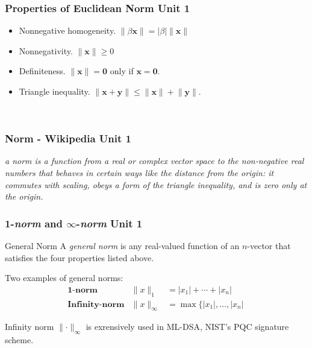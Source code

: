 \documentclass[12pt]{beamer}
\newcommand{\FrameTitle}[2]{\frametitle{#1 \hfill \small\textnormal{\textcolor{midgray}{#2}}}}
\newcommand{\snl}{\vspace*{4pt}\\}
\newcommand{\Quiz}[1]{{\large\textbf{\color{question}{#1}}}}
\newcommand{\QuizQuestion}[1]{{\Large\textbf{\color{question}{#1}}}}
\newcommand{\MVec}[1]{\mathbf{#1}}
\newcommand{\Norm}[1]{\lVert {\mathbf{#1}} \rVert}
\newcommand{\NormBeta}[1]{\lVert \beta \mathbf{#1} \rVert}
\newcommand{\abs}[1]{\lvert {#1} \rvert}
\begin{document}
\begin{frame}\FrameTitle{Properties of Euclidean Norm}{Unit 1}
    \begin{itemize}
        \item Nonnegative homogeneity. $\NormBeta{x}  = \abs{\beta}\Norm{x}$
        \item Nonnegativity. $\Norm{x} \ge 0$
        \item Definiteness. $\Norm{x} = \MVec{0}$ only if $\MVec{x} = \MVec{0}$.
        \item Triangle inequality. $\Norm{x+y} \le \Norm{x} + \Norm{y}$.
    \end{itemize}

    \vspace*{2em}
    \hspace*{1.2em}\Quiz{Quiz:}\snl
    \vspace*{2pt}
    \hspace*{1.2em}{\QuizQuestion{Example for triangle inequality?}}
\end{frame}

\begin{frame}\FrameTitle{Norm - Wikipedia}{Unit 1}
    \emph{a norm is a function from a real or complex vector space
    to the non-negative real numbers that behaves in certain ways like
    the distance from the origin: it commutes with scaling, obeys a form
    of the triangle inequality, and is zero only at the origin.}
\end{frame}


\begin{frame}\FrameTitle{1-\emph{norm} and $\infty$-\emph{norm}}{Unit 1}
    \begin{definition}{General Norm}
        A \emph{general norm} is any real-valued function of an $n$-vector
        that satisfies the four properties listed above.
    \end{definition}

    \vspace*{1em}

    Two examples of general norms:
    \[
    \begin{array}{rll}
        \textbf{1-norm}        &  \lVert x \rVert_1      &= \lvert x_1 \rvert + \cdots + \lvert x_n \rvert \\[4pt]
        \textbf{Infinity-norm} &  \lVert x \rVert_{\infty} &= \max \{\lvert x_1 \rvert, \ldots, \lvert x_n \rvert \
    \end{array}
    \]

    \vspace*{2em}
    Infinity norm $\Norm{\cdot}_{\infty}$ is exrensively used in
    ML-DSA, NIST's PQC signature scheme.
\end{frame}
\end{document}
